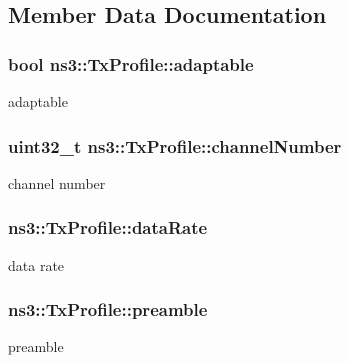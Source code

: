 \subsection{Member Data Documentation}
\subsubsection[{\texorpdfstring{adaptable}{adaptable}}]{\setlength{\rightskip}{0pt plus 5cm}bool ns3\+::\+Tx\+Profile\+::adaptable}\hypertarget{structns3_1_1TxProfile_a5ab1a6b737ba020a12498afabefa68f8}{}\label{structns3_1_1TxProfile_a5ab1a6b737ba020a12498afabefa68f8}


adaptable 

\subsubsection[{\texorpdfstring{channel\+Number}{channelNumber}}]{\setlength{\rightskip}{0pt plus 5cm}uint32\+\_\+t ns3\+::\+Tx\+Profile\+::channel\+Number}\hypertarget{structns3_1_1TxProfile_a6ee2354a51951ca34dfbec1677f6bfa3}{}\label{structns3_1_1TxProfile_a6ee2354a51951ca34dfbec1677f6bfa3}


channel number 

\subsubsection[{\texorpdfstring{data\+Rate}{dataRate}}]{ ns3\+::\+Tx\+Profile\+::data\+Rate}\hypertarget{structns3_1_1TxProfile_a28ed5bf9dd2e23cd6b04be7deb7e320a}{}\label{structns3_1_1TxProfile_a28ed5bf9dd2e23cd6b04be7deb7e320a}


data rate 

\subsubsection[{\texorpdfstring{preamble}{preamble}}]{ ns3\+::\+Tx\+Profile\+::preamble}\hypertarget{structns3_1_1TxProfile_a2a3b9303ef59326971fe7d158656adb6}{}\label{structns3_1_1TxProfile_a2a3b9303ef59326971fe7d158656adb6}
preamble 
